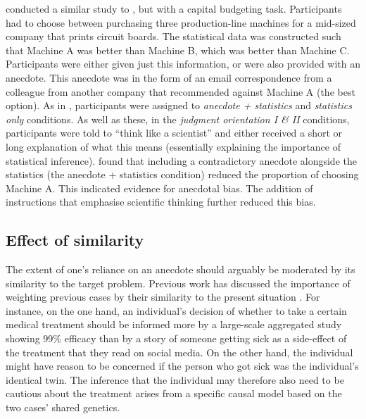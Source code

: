 \documentclass[a4paper, nobind, dvipsnames]{templates/ociamthesis}
\theoremstyle{definition}
\theoremstyle{definition}
\theoremstyle{definition}
\theoremstyle{definition}
\theoremstyle{remark}
\begin{document}
\textcite{wainberg2018} conducted a similar study to \textcite{wainberg2013}, but with a capital
budgeting task. Participants had to choose between purchasing three
production-line machines for a mid-sized company that prints circuit boards. The
statistical data was constructed such that Machine A was better than Machine B,
which was better than Machine C. Participants were either given just this
information, or were also provided with an anecdote. This anecdote was in the
form of an email correspondence from a colleague from another company that
recommended against Machine A (the best option). As in \textcite{wainberg2013},
participants were assigned to \emph{anecdote + statistics} and \emph{statistics only}
conditions. As well as these, in the \emph{judgment orientation I \& II} conditions,
participants were told to ``think like a scientist'' and either received a short
or long explanation of what this means (essentially explaining the importance of
statistical inference). \textcite{wainberg2018} found that including a contradictory
anecdote alongside the statistics (the anecdote + statistics condition) reduced
the proportion of choosing Machine A. This indicated evidence for anecdotal
bias. The addition of instructions that emphasise scientific thinking further
reduced this bias.

\subsection{Effect of similarity}

The extent of one's reliance on an anecdote should arguably be moderated by its
similarity to the target problem. Previous work has discussed the importance of
weighting previous cases by their similarity to the present situation
\autocite{gilboa1995,lovallo2012}. For instance, on the one hand, an individual's
decision of whether to take a certain medical treatment should be informed more
by a large-scale aggregated study showing 99\% efficacy than by a story of
someone getting sick as a side-effect of the treatment that they read on social
media. On the other hand, the individual might have reason to be concerned if
the person who got sick was the individual's identical twin. The inference that
the individual may therefore also need to be cautious about the treatment arises
from a specific causal model based on the two cases' shared genetics.
\end{document}
